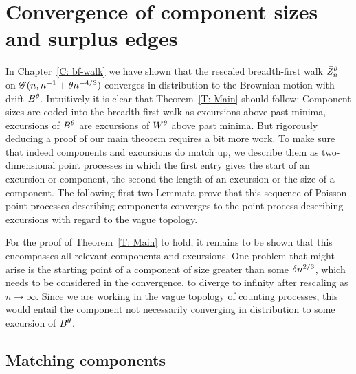 
\chapter{Convergence of component sizes and surplus edges} \label{C: convergence}


In Chapter~\ref{C: bf-walk} we have shown that the rescaled breadth-first walk $\bar{Z}^{\theta}_n$ on $\mathscr{G}(n, n^{-1} + \theta n^{-4/3})$
converges in distribution to the Brownian motion with drift $B^{\theta}$.
Intuitively it is clear that Theorem~\ref{T: Main} should follow:
Component sizes are coded into the breadth-first walk as excursions above past minima,
excursions of $B^{\theta}$ are excursions of $W^{\theta}$ above past minima.
But rigorously deducing a proof of our main theorem requires a bit more work.
To make sure that indeed components and excursions do match up,
we describe them as two-dimensional point processes
in which the first entry gives the start of an excursion or component, 
the second the length of an excursion or the size of a component.
The following first two Lemmata prove that this sequence of Poisson point processes describing components 
converges to the point process describing excursions with regard to the vague topology.

For the proof of Theorem~\ref{T: Main} to hold, it remains to be shown that this encompasses all relevant components and excursions.
One problem that might arise is the starting point of a component of size greater than some $\delta n^{2 / 3}$, 
which needs to be considered in the convergence, to diverge to infinity after rescaling as $n \rightarrow \infty$.
Since we are working in the vague topology of counting processes, 
this would entail the component not necessarily converging in distribution to some excursion of $B^{\theta}$.


\section{Matching components}

